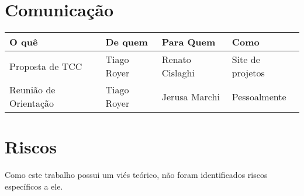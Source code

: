 \documentclass[12pt]{article}
\begin{document}
\section{Comunicação}
    \begin{tabular}{l l l l}
        \hline
        O quê                   & De quem       & Para Quem         & Como \\
        \hline
        Proposta de TCC         & Tiago Royer   & Renato Cislaghi   & Site de projetos \\
        Reunião de Orientação   & Tiago Royer   & Jerusa Marchi & Pessoalmente \\
        \hline
    \end{tabular}

\section{Riscos}
    Como este trabalho possui um viés teórico, não foram identificados
    riscos específicos a ele.



\end{document}
